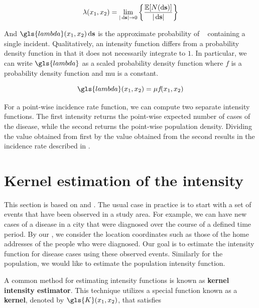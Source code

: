\begin{equation}
    \label{eq:lambda_differential}
    \lambda \xvec = \lim_{|\ds| \to 0}
        \left\{
            \frac{\mathbb{E}[N(\ds)]}%
            {|\ds|}
        \right\}
\end{equation}

And $\gls{lambda}\xvec \ds$ is the approximate probability of \ds~ containing a single incident.
Qualitatively, an intensity function differs from a probability density function in that it does not necessarily integrate to $1$.
In particular, we can write $\gls{lambda}$ as a scaled probability density function
where $f$ is a probability density function and \gls{mu} is a constant.

\begin{equation}
    \label{eq:lambda_mu}
    \gls{lambda}\xvec = \mu f\!\xvec
\end{equation}

For a point-wise \gls{incidence rate} function,
we can compute two separate \gls{intensity} functions.
The first \gls{intensity} returns the point-wise expected number of cases of the disease,
while the second returns the point-wise population density.
Dividing the value obtained from first by the value obtained from the second results in the \gls{incidence rate} described in .

\section{Kernel estimation of the intensity}
\label{sec:theory:kernelestimation}

This section is based on \citet{silverman1986density} and \citet{wand1994kernel}.
The usual case in practice is to start with a set of \glspl{event} that have been observed in a study area.
For example, we can have new cases of a disease in a city that were diagnosed over the course of a defined time period.
By our ,
we consider the location coordinates such as those of the home addresses of the people who were diagnosed.
Our goal is to estimate the \gls{intensity} function for disease cases using these observed \glspl{event}.
Similarly for the population,
we would like to estimate the population \gls{intensity} function.

A common method for estimating \gls{intensity} functions is known as
\textbf{\gls{kernel intensity estimator}}.
This technique utilizes a special function known as a \textbf{\gls{kernel}},
denoted by $\gls{K}\xvec$,
that satisfies

